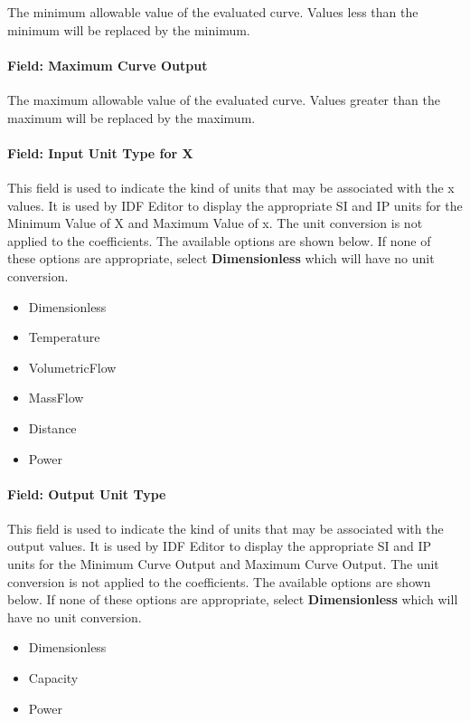 The minimum allowable value of the evaluated curve. Values less than the minimum will be replaced by the minimum.

\paragraph{Field: Maximum Curve Output}\label{field-maximum-curve-output-2}

The maximum allowable value of the evaluated curve. Values greater than the maximum will be replaced by the maximum.

\paragraph{Field: Input Unit Type for X}\label{field-input-unit-type-for-x-3}

This field is used to indicate the kind of units that may be associated with the x values. It is used by IDF Editor to display the appropriate SI and IP units for the Minimum Value of X and Maximum Value of x. The unit conversion is not applied to the coefficients. The available options are shown below. If none of these options are appropriate, select \textbf{Dimensionless} which will have no unit conversion.

\begin{itemize}
\item
  Dimensionless
\item
  Temperature
\item
  VolumetricFlow
\item
  MassFlow
\item
  Distance
\item
  Power
\end{itemize}

\paragraph{Field: Output Unit Type}\label{field-output-unit-type-2}

This field is used to indicate the kind of units that may be associated with the output values. It is used by IDF Editor to display the appropriate SI and IP units for the Minimum Curve Output and Maximum Curve Output. The unit conversion is not applied to the coefficients. The available options are shown below. If none of these options are appropriate, select \textbf{Dimensionless} which will have no unit conversion.

\begin{itemize}
\item
  Dimensionless
\item
  Capacity
\item
  Power
\end{itemize}

